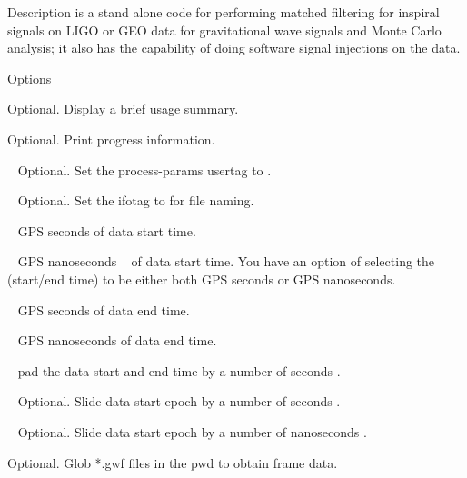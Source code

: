 \begin{entry}
\item[Description] 
 is a stand alone code for performing matched filtering for inspiral signals on LIGO 
or GEO data for gravitational wave signals and Monte Carlo analysis; it also has the capability of doing software signal injections on the data. 

\item[Options]\leavevmode
\begin{entry}
\item[\option{--help}] Optional. Display a brief usage summary.

\item[\option{--verbose}] Optional. Print progress information.

\item[\option{user-tag}~\parm{STRING}] Optional. Set the process-params 
usertag to .

\item[\option{--ifo-tag}~\parm{STRING}] Optional. Set the ifotag to 
 for file naming.

\item[\option{--gps-start-time}~\parm{SEC}] GPS seconds  of data 
start time.

\item[\option{--gps-start-time-ns}~\parm{NS}] GPS nanoseconds ~ of 
data start time. You have an option of selecting the (start/end time) to be either both 
GPS seconds or GPS nanoseconds.

\item[\option{--gps-end-time}~\parm{SEC}] GPS seconds  of data end 
time.

\item[\option{--gps-end-time-ns}~\parm{NS}] GPS nanoseconds  
of data end time.

\item[\option{--pad-data}~\parm{SEC}] pad the data start and end time 
by a number of seconds .

\item[\option{--slide-time}~\parm{SEC}] Optional. Slide data start epoch by 
a number of seconds .

\item[\option{--slide-time-ns}~\parm{NS}] Optional. Slide data start epoch 
by a number of nanoseconds .

\item[\option{--glob-frame-data}] Optional. Glob *.gwf files in the pwd to 
obtain frame data.


\end{entry}
\end{entry}
